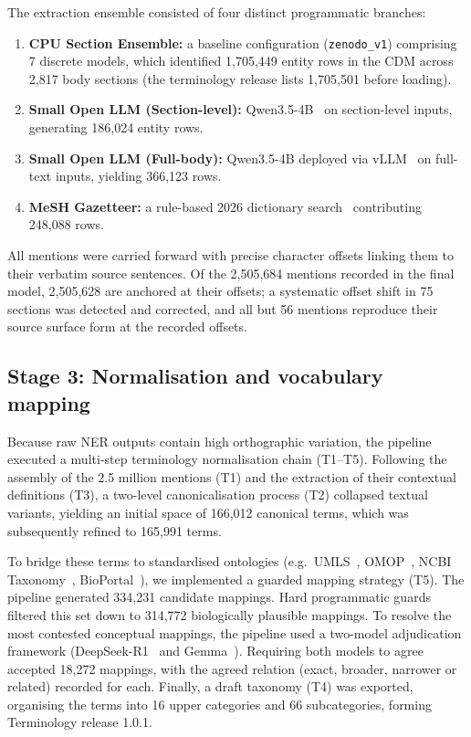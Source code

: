 \documentclass[referee,lineno,pdflatex,sn-vancouver-num]{sn-jnl}
\theoremstyle{thmstyleone}%
\theoremstyle{thmstyletwo}%
\theoremstyle{thmstylethree}%
\begin{document}
The extraction ensemble consisted of four distinct programmatic branches:
\begin{enumerate}
\item \textbf{CPU Section Ensemble:} a baseline configuration
(\texttt{zenodo\_v1}) comprising 7 discrete models, which identified
1,705,449 entity rows in the CDM across 2,817 body sections (the terminology
release lists 1,705,501 before loading).
\item \textbf{Small Open LLM (Section-level):} Qwen3.5-4B~\cite{qwen35card} on section-level inputs, generating 186,024 entity rows.
\item \textbf{Small Open LLM (Full-body):} Qwen3.5-4B deployed via
vLLM~\cite{qwen35card,kwon2023vllm} on full-text inputs, yielding 366,123
rows.
\item \textbf{MeSH Gazetteer:} a rule-based 2026 dictionary
search~\cite{lipscomb2000mesh} contributing 248,088 rows.
\end{enumerate}

All mentions were carried forward with precise character offsets linking
them to their verbatim source sentences. Of the 2,505,684 mentions recorded
in the final model, 2,505,628 are anchored at their offsets; a systematic
offset shift in 75 sections was detected and corrected, and all but 56
mentions reproduce their source surface form at the recorded offsets.

\subsection{Stage 3: Normalisation and vocabulary mapping}\label{sec:stage3}

Because raw NER outputs contain high orthographic variation, the pipeline
executed a multi-step terminology normalisation chain (T1--T5). Following
the assembly of the 2.5 million mentions (T1) and the extraction of their
contextual definitions (T3), a two-level canonicalisation process (T2)
collapsed textual variants, yielding an initial space of 166,012 canonical
terms, which was subsequently refined to 165,991 terms.

To bridge these terms to standardised ontologies (e.g.\
UMLS~\cite{bodenreider2004umls}, OMOP~\cite{hripcsak2015ohdsi}, NCBI
Taxonomy~\cite{schoch2020taxonomy}, BioPortal~\cite{whetzel2011bioportal}),
we implemented a guarded mapping strategy (T5). The pipeline generated
334,231 candidate mappings. Hard programmatic guards filtered this set
down to 314,772 biologically plausible mappings. To resolve the most
contested conceptual mappings, the pipeline used a two-model adjudication
framework (DeepSeek-R1~\cite{guo2025deepseekr1} and
Gemma~\cite{gemma2026gemma4}). Requiring both models to agree accepted
18,272 mappings, with the agreed relation (exact, broader, narrower or related)
recorded for each. Finally, a draft taxonomy
(T4) was exported, organising the terms into 16 upper categories and 66
subcategories, forming Terminology release 1.0.1.
\end{document}
